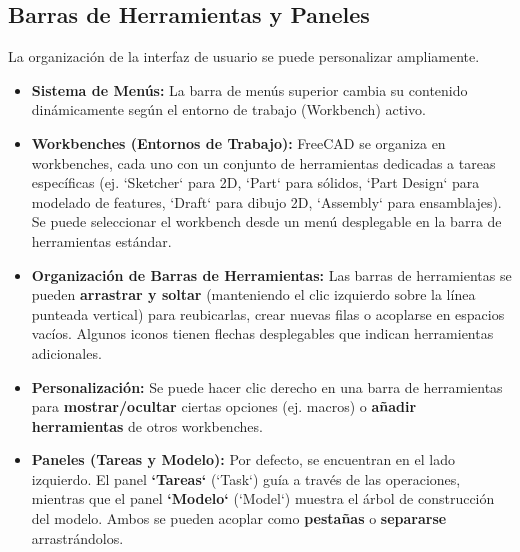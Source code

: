 \documentclass[12pt]{article}
\begin{document}
\subsection{Barras de Herramientas y Paneles}
La organización de la interfaz de usuario se puede personalizar ampliamente.
\begin{itemize}[label=\textbullet]
    \item \textbf{Sistema de Menús:} La barra de menús superior cambia su contenido dinámicamente según el entorno de trabajo (Workbench) activo.
    \item \textbf{Workbenches (Entornos de Trabajo):} FreeCAD se organiza en workbenches, cada uno con un conjunto de herramientas dedicadas a tareas específicas (ej. `Sketcher` para 2D, `Part` para sólidos, `Part Design` para modelado de features, `Draft` para dibujo 2D, `Assembly` para ensamblajes). Se puede seleccionar el workbench desde un menú desplegable en la barra de herramientas estándar.
    \item \textbf{Organización de Barras de Herramientas:} Las barras de herramientas se pueden \textbf{arrastrar y soltar} (manteniendo el clic izquierdo sobre la línea punteada vertical) para reubicarlas, crear nuevas filas o acoplarse en espacios vacíos. Algunos iconos tienen flechas desplegables que indican herramientas adicionales.
    \item \textbf{Personalización:} Se puede hacer clic derecho en una barra de herramientas para \textbf{mostrar/ocultar} ciertas opciones (ej. macros) o \textbf{añadir herramientas} de otros workbenches.
    \item \textbf{Paneles (Tareas y Modelo):} Por defecto, se encuentran en el lado izquierdo. El panel \textbf{`Tareas`} (`Task`) guía a través de las operaciones, mientras que el panel \textbf{`Modelo`} (`Model`) muestra el árbol de construcción del modelo. Ambos se pueden acoplar como \textbf{pestañas} o \textbf{separarse} arrastrándolos.
\end{itemize}

\end{document}
